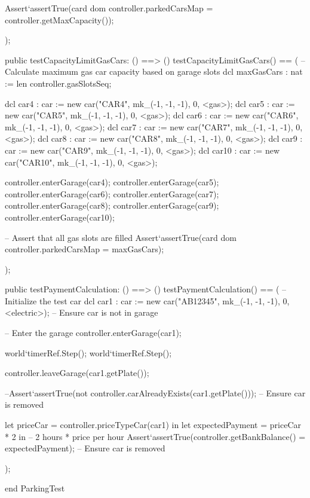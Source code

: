 \documentclass[a4paper]{article}
\begin{document}
\begin{vdm_al}
        Assert`assertTrue(card dom controller.parkedCarsMap = controller.getMaxCapacity());
    
    );
    
public testCapacityLimitGasCars: () ==> ()
testCapacityLimitGasCars() ==
(   
    -- Calculate maximum gas car capacity based on garage slots
    dcl maxGasCars : nat := len controller.gasSlotsSeq;
    
        dcl car4 : car := new car("CAR4", mk_(-1, -1, -1), 0, <gas>);
        dcl car5 : car := new car("CAR5", mk_(-1, -1, -1), 0, <gas>);
        dcl car6 : car := new car("CAR6", mk_(-1, -1, -1), 0, <gas>);
        dcl car7 : car := new car("CAR7", mk_(-1, -1, -1), 0, <gas>);
        dcl car8 : car := new car("CAR8", mk_(-1, -1, -1), 0, <gas>);
        dcl car9 : car := new car("CAR9", mk_(-1, -1, -1), 0, <gas>);
        dcl car10 : car := new car("CAR10", mk_(-1, -1, -1), 0, <gas>);
        
        
        
        
        controller.enterGarage(car4);
        controller.enterGarage(car5);
        controller.enterGarage(car6);
        controller.enterGarage(car7);
        controller.enterGarage(car8);
        controller.enterGarage(car9);
        controller.enterGarage(car10);
    
        -- Assert that all gas slots are filled
        Assert`assertTrue(card dom controller.parkedCarsMap = maxGasCars);

);


    public testPaymentCalculation: () ==> ()
testPaymentCalculation() ==
(
    -- Initialize the test car
    dcl car1 : car := new car("AB12345", mk_(-1, -1, -1), 0, <electric>);
     -- Ensure car is not in garage
    
    -- Enter the garage
    controller.enterGarage(car1);
    
    world`timerRef.Step(); 
    world`timerRef.Step();  
    
    controller.leaveGarage(car1.getPlate());

    --Assert`assertTrue(not controller.carAlreadyExists(car1.getPlate()));  -- Ensure car is removed
    
    let priceCar = controller.priceTypeCar(car1) in
    let expectedPayment = priceCar * 2 in
      -- 2 hours * price per hour
    Assert`assertTrue(controller.getBankBalance() = expectedPayment);  -- Ensure car is removed

    
);


end ParkingTest
\end{vdm_al}
\end{document}
